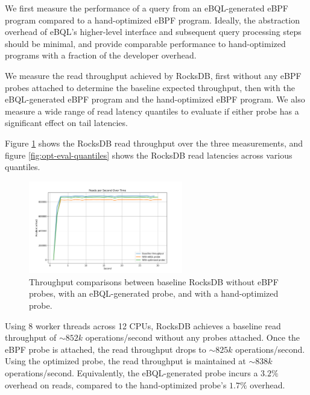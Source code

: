 We first measure the performance of a query from an eBQL-generated eBPF program compared to a
hand-optimized eBPF program. Ideally, the abstraction overhead of eBQL's higher-level interface and
subsequent query processing steps should be minimal, and provide comparable performance to
hand-optimized programs with a fraction of the developer overhead.

We measure the read throughput achieved by RocksDB, first without any eBPF probes attached to
determine the baseline expected throughput, then with the eBQL-generated eBPF program and the
hand-optimized eBPF program. We also measure a wide range of read latency quantiles to evaluate if
either probe has a significant effect on tail latencies.

Figure \ref{fig:opt-eval-throughput} shows the RocksDB read throughput over the three measurements,
and figure \ref{fig:opt-eval-quantiles} shows the RocksDB read latencies across various quantiles.

\begin{figure}[htpb]
    \centering
    \includegraphics[width=0.6\textwidth]{diagrams/opt-eval-throughput.png}
    \caption{Throughput comparisons between baseline RocksDB without eBPF probes, with an
    eBQL-generated probe, and with a hand-optimized probe.}
    \label{fig:opt-eval-throughput}
\end{figure}

Using 8 worker threads across 12 CPUs, RocksDB achieves a baseline read throughput of $\sim 852k$
operations/second without any probes attached. Once the eBPF probe is attached, the read throughput
drops to $\sim 825k$ operations/second. Using the optimized probe, the read throughput is maintained
at $\sim 838k$ operations/second. Equivalently, the eBQL-generated probe incurs a $3.2\%$ overhead
on reads, compared to the hand-optimized probe's $1.7\%$ overhead.

